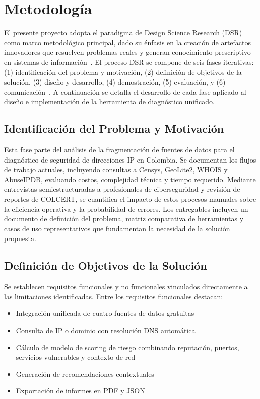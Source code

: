 \section{Metodología}\label{sec:metodologia}

El presente proyecto adopta el paradigma de Design Science Research (DSR) como marco metodológico principal, dado su énfasis en la creación de artefactos innovadores que resuelven problemas reales y generan conocimiento prescriptivo en sistemas de información~\cite{Hevner2004}. El proceso DSR se compone de seis fases iterativas: (1) identificación del problema y motivación, (2) definición de objetivos de la solución, (3) diseño y desarrollo, (4) demostración, (5) evaluación, y (6) comunicación~\cite{Peffers2007}. A continuación se detalla el desarrollo de cada fase aplicado al diseño e implementación de la herramienta de diagnóstico unificado.

\subsection{Identificación del Problema y Motivación}
Esta fase parte del análisis de la fragmentación de fuentes de datos para el diagnóstico de seguridad de direcciones IP en Colombia. Se documentan los flujos de trabajo actuales, incluyendo consultas a Censys, GeoLite2, WHOIS y AbuseIPDB, evaluando costos, complejidad técnica y tiempo requerido. Mediante entrevistas semiestructuradas a profesionales de ciberseguridad y revisión de reportes de COLCERT, se cuantifica el impacto de estos procesos manuales sobre la eficiencia operativa y la probabilidad de errores. Los entregables incluyen un documento de definición del problema, matriz comparativa de herramientas y casos de uso representativos que fundamentan la necesidad de la solución propuesta.

\subsection{Definición de Objetivos de la Solución}
Se establecen requisitos funcionales y no funcionales vinculados directamente a las limitaciones identificadas. Entre los requisitos funcionales destacan:
\begin{itemize}
    \item Integración unificada de cuatro fuentes de datos gratuitas
    \item Consulta de IP o dominio con resolución DNS automática
    \item Cálculo de modelo de scoring de riesgo combinando reputación, puertos, servicios vulnerables y contexto de red
    \item Generación de recomendaciones contextuales
    \item Exportación de informes en PDF y JSON
\end{itemize}

